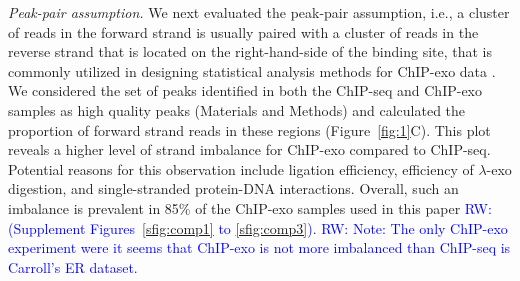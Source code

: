 \documentclass{bmcart}
\newcommand{\RW}[1]{\textcolor{blue}{RW: #1}}
\begin{document}
\textit{Peak-pair assumption.} We next evaluated the peak-pair
assumption, i.e., a cluster of reads in the forward strand is usually
paired with a cluster of reads in the reverse strand that is located
on the right-hand-side of the binding site, that is commonly utilized
in designing statistical analysis methods for ChIP-exo data
\cite{mace, cexor, peakzilla}.  We considered the set of peaks
identified in both the ChIP-seq and ChIP-exo samples as high quality
peaks (Materials and Methods) and calculated the proportion of forward
strand reads in these regions (Figure~\ref{fig:1}C). This plot
reveals a higher level of strand imbalance for ChIP-exo compared to
ChIP-seq.
Potential reasons for this observation include ligation efficiency,
efficiency of $\lambda$-exo digestion, and single-stranded protein-DNA
interactions. Overall, such an imbalance is prevalent in 85\% of the
ChIP-exo samples used in this paper \RW{(Supplement
  Figures~\ref{sfig:comp1} to \ref{sfig:comp3})}. \RW{Note: The only ChIP-exo
  experiment were it seems that ChIP-exo is not more imbalanced than
  ChIP-seq is Carroll's ER dataset.}
\end{document}

